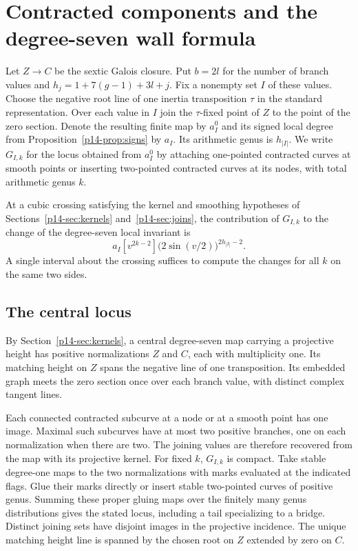 \section{Contracted components and the degree-seven wall formula}\label{p14-sec:virtual}

Let $Z\to C$ be the sextic Galois closure. Put $b=2l$ for the
number of branch values and $h_j=1+7(g-1)+3l+j$.
Fix a nonempty set $I$ of these values. Choose the negative root
line of one inertia transposition $\tau$ in the standard representation.
Over each value in $I$ join the $\tau$-fixed point of $Z$ to the
point of the zero section. Denote the resulting finite map by $a_I^0$
and its signed local degree from Proposition~\ref{p14-prop:signs} by $a_I$.
Its arithmetic genus is $h_{|I|}$. We write $G_{I,k}$ for the locus
obtained from $a_I^0$ by attaching one-pointed contracted curves at
smooth points or inserting two-pointed contracted curves at its nodes,
with total arithmetic genus $k$.

\begin{proposition}\label{p14-prop:virtual-joins}
At a cubic crossing satisfying the kernel and smoothing hypotheses of
Sections~\ref{p14-sec:kernels} and~\ref{p14-sec:joins}, the contribution of
$G_{I,k}$ to the change of the degree-seven local invariant is
\[
       a_I [v^{2k-2}]\bigl(2\sin(v/2)\bigr)^{2h_{|I|}-2}.
\]
A single interval about the crossing suffices to compute the changes
for all $k$ on the same two sides.
\end{proposition}

\subsection{The central locus}
By Section~\ref{p14-sec:kernels}, a central degree-seven map carrying a
projective height has positive normalizations \(Z\) and \(C\), each
with multiplicity one. Its matching height on \(Z\) spans the negative
line of one transposition. Its embedded graph meets the zero section
once over each branch value, with distinct complex tangent lines.

Each connected contracted subcurve at a node or at a smooth point has
one image. Maximal such subcurves have at most two positive branches,
one on each normalization when there are two. The joining values are
therefore recovered from the map with its projective kernel.
For fixed $k$, $G_{I,k}$ is compact. Take stable degree-one maps to
the two normalizations with marks evaluated at the indicated flags.
Glue their marks directly or insert stable two-pointed curves of
positive genus. Summing these proper gluing maps over the finitely
many genus distributions gives the stated locus, including a tail
specializing to a bridge. Distinct joining sets have disjoint images
in the projective incidence. The unique matching height line is
spanned by the chosen root on $Z$ extended by zero on $C$.

